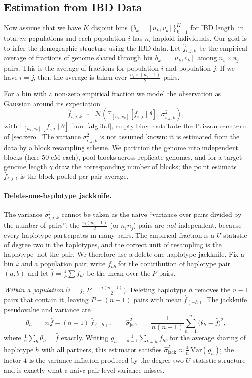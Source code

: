 \documentclass[12pt]{article}
\theoremstyle{definition}
\theoremstyle{definition}
\theoremstyle{lemma}
\theoremstyle{remark}
\theoremstyle{definition}
\begin{document}
\subsection{Estimation from IBD Data}\label{sec:estimation}
Now assume that we have $K$ disjoint bins $\{b_k = [u_k, v_k]\}_{k=1}^{K}$ for IBD length, in total $m$ populations and each population $i$ has $n_i$ haploid individuals. Our goal is to infer the demographic structure using the IBD data. Let $\hat{f}_{i,j,k}$ be the empirical average of fractions of genome shared through bin $b_k = [u_k,v_k]$ among $n_i\times n_j$ pairs. This is the average of fractions for population $i$ and population $j$. If we have $i=j$, then the average is taken over $\frac{n_i\times(n_i-1)}{2}$ pairs.

For a bin with a non-zero empirical fraction we model the observation as Gaussian
around its expectation,
\[
  \hat f_{i,j,k} \;\sim\; \mathcal{N}\!\left(\mathbb{E}_{[u_k,v_k]}[f_{i,j}\mid\theta],\,
  \sigma^2_{i,j,k}\right),
\]
with $\mathbb{E}_{[u_k,v_k]}[f_{i,j}\mid\theta]$ from \cref{alg:ibd}; empty bins
contribute the Poisson zero term of \cref{sec:zero}. The variance
$\sigma^2_{i,j,k}$ is not assumed known: it is estimated from the data by a
block resampling scheme. We partition the genome into independent blocks (here
$50$ cM each), pool blocks across replicate genomes, and for a target genome
length $\gamma$ draw the corresponding number of blocks; the point estimate
$\hat f_{i,j,k}$ is the block-pooled per-pair average.

\paragraph{Delete-one-haplotype jackknife.}
The variance $\sigma^2_{i,j,k}$ cannot be taken as the naive ``variance over
pairs divided by the number of pairs'': the $\tfrac{n_i(n_i-1)}{2}$ (or
$n_in_j$) pairs are \emph{not} independent, because every haplotype participates
in many pairs. The empirical fraction is a $U$-statistic of degree two in the
haplotypes, and the correct unit of resampling is the haplotype, not the pair.
We therefore use a delete-one-haplotype jackknife. Fix a bin $k$ and a
population pair; write $f_{ab}$ for the contribution of haplotype pair $(a,b)$
and let $\hat f = \tfrac1P\sum f_{ab}$ be the mean over the $P$ pairs.

\emph{Within a population} ($i=j$, $P=\tfrac{n(n-1)}{2}$). Deleting haplotype $h$
removes the $n-1$ pairs that contain it, leaving $P-(n-1)$ pairs with mean
$\hat f_{(-h)}$. The jackknife pseudovalue and variance are
\[
  \theta_h \;=\; n\,\hat f - (n-1)\,\hat f_{(-h)},
  \qquad
  \hat\sigma^2_{\text{jack}}
  \;=\; \frac{1}{n(n-1)}\sum_{h=1}^{n}\big(\theta_h-\hat f\big)^2 ,
\]
where $\tfrac1n\sum_h\theta_h=\hat f$ exactly. Writing
$g_h=\tfrac{1}{n-1}\sum_{b\neq h} f_{hb}$ for the average sharing of haplotype
$h$ with all partners, this estimator satisfies
$\hat\sigma^2_{\text{jack}}\approx \tfrac{4}{n}\,\mathrm{Var}(g_h)$; the factor
$4$ is the variance inflation produced by the degree-two $U$-statistic structure
and is exactly what a naive pair-level variance misses.
\end{document}
